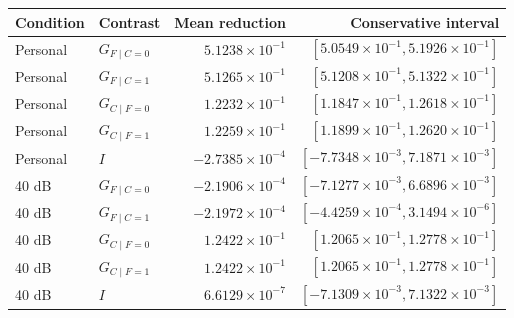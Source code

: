 \begin{tabular}{llrr}
\toprule
Condition & Contrast & Mean reduction & Conservative interval \\
\midrule
Personal & $G_{F\mid C=0}$ & $5.1238\times10^{-1}$ & $[5.0549\times10^{-1}, 5.1926\times10^{-1}]$ \\
Personal & $G_{F\mid C=1}$ & $5.1265\times10^{-1}$ & $[5.1208\times10^{-1}, 5.1322\times10^{-1}]$ \\
Personal & $G_{C\mid F=0}$ & $1.2232\times10^{-1}$ & $[1.1847\times10^{-1}, 1.2618\times10^{-1}]$ \\
Personal & $G_{C\mid F=1}$ & $1.2259\times10^{-1}$ & $[1.1899\times10^{-1}, 1.2620\times10^{-1}]$ \\
Personal & $I$ & $-2.7385\times10^{-4}$ & $[-7.7348\times10^{-3}, 7.1871\times10^{-3}]$ \\
40 dB & $G_{F\mid C=0}$ & $-2.1906\times10^{-4}$ & $[-7.1277\times10^{-3}, 6.6896\times10^{-3}]$ \\
40 dB & $G_{F\mid C=1}$ & $-2.1972\times10^{-4}$ & $[-4.4259\times10^{-4}, 3.1494\times10^{-6}]$ \\
40 dB & $G_{C\mid F=0}$ & $1.2422\times10^{-1}$ & $[1.2065\times10^{-1}, 1.2778\times10^{-1}]$ \\
40 dB & $G_{C\mid F=1}$ & $1.2422\times10^{-1}$ & $[1.2065\times10^{-1}, 1.2778\times10^{-1}]$ \\
40 dB & $I$ & $6.6129\times10^{-7}$ & $[-7.1309\times10^{-3}, 7.1322\times10^{-3}]$ \\
\bottomrule
\end{tabular}
